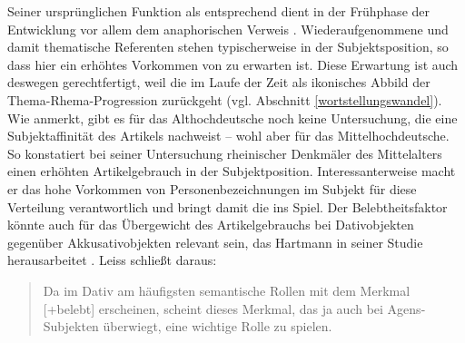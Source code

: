 Seiner ursprünglichen Funktion als  entsprechend dient  in der Frühphase der Entwicklung vor allem dem anaphorischen  Verweis \parencite[s. u.a.][]{Jager1917,Oubouzar1992,Leiss2000}. Wiederaufgenommene und damit thematische Referenten  stehen typischerweise in der  Subjektsposition, so dass hier ein erhöhtes Vorkommen von  zu erwarten ist. Diese Erwartung ist auch deswegen gerechtfertigt, weil die  im Laufe der Zeit als ikonisches Abbild der Thema-Rhema-Progression  zurückgeht (vgl. Abschnitt \ref{wortstellungswandel}). Wie  \textcite[165]{Leiss2000} anmerkt, gibt es für das Althochdeutsche noch keine Untersuchung, die eine Subjektaffinität des Artikels nachweist -- wohl aber für das Mittelhochdeutsche. So konstatiert \textcite[33--35]{Hartmann1967} bei seiner Untersuchung rheinischer Denkmäler des Mittelalters einen erhöhten Artikelgebrauch in der  Subjektposition. Interessanterweise macht er das hohe Vorkommen von Personenbezeichnungen im Subjekt für diese Verteilung verantwortlich und bringt damit die  ins Spiel. Der Belebtheitsfaktor könnte auch für das Übergewicht des Artikelgebrauchs bei Dativobjekten  gegenüber Akkusativobjekten relevant sein, das Hartmann in seiner Studie herausarbeitet \parencite[42--43]{Hartmann1967}. Leiss schließt daraus: \blockcquote[165]{Leiss2000}{Da im Dativ am häufigsten semantische Rollen  mit dem Merkmal [+belebt]  erscheinen,
scheint dieses Merkmal, das ja auch bei Agens-Subjekten überwiegt, eine wichtige Rolle zu spielen.} 

